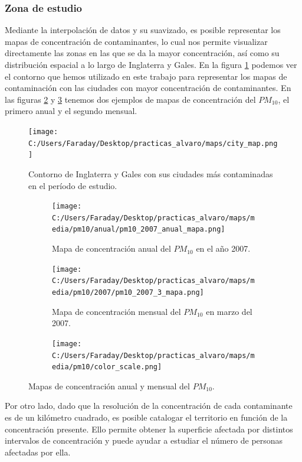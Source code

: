 \documentclass[12pt]{article}
\begin{document}
\subsubsection{Zona de estudio}

Mediante la interpolación de datos y su suavizado, es posible representar los mapas de concentración de contaminantes, lo cual nos permite visualizar directamente las zonas en las que se da la mayor concentración, así como su distribución espacial a lo largo de Inglaterra y Gales. En la figura \ref{fig:map-city} podemos ver el contorno que hemos utilizado en este trabajo para representar los mapas de contaminación con las ciudades con mayor concentración de contaminantes. En las figuras \ref{fig:map-ejem-1} y \ref{fig:map-ejem-2} tenemos dos ejemplos de mapas de concentración del $PM_{10}$, el primero anual y el segundo mensual.

\begin{figure}[H]
\centering
\texttt{[image: C:/Users/Faraday/Desktop/practicas\_alvaro/maps/city\_map.png]}
\caption{Contorno de Inglaterra y Gales con sus ciudades más contaminadas en el período de estudio.}
\label{fig:map-city}
\end{figure}

\begin{figure}[H]
\centering
\begin{subfigure}[H]{0.45\textwidth}
\texttt{[image: C:/Users/Faraday/Desktop/practicas\_alvaro/maps/media/pm10/anual/pm10\_2007\_anual\_mapa.png]}
\caption{Mapa de concentración anual del $PM_{10}$ en el año 2007.}
\label{fig:map-ejem-1}
\end{subfigure}
%
\begin{subfigure}[H]{0.45\textwidth}
\texttt{[image: C:/Users/Faraday/Desktop/practicas\_alvaro/maps/media/pm10/2007/pm10\_2007\_3\_mapa.png]}
\caption{Mapa de concentración mensual del $PM_{10}$ en marzo del 2007.}
\label{fig:map-ejem-2}
\end{subfigure}

\begin{subfigure}[H]{0.45\textwidth}
\texttt{[image: C:/Users/Faraday/Desktop/practicas\_alvaro/maps/media/pm10/color\_scale.png]}
\captionsetup{labelformat=empty}
\caption{}
\end{subfigure}
\caption{Mapas de concentración anual y mensual del $PM_{10}$.}
\end{figure}

Por otro lado, dado que la resolución de la concentración de cada contaminante es de un kilómetro cuadrado, es posible catalogar el territorio en función de la concentración presente. Ello permite obtener la superficie afectada por distintos intervalos de concentración y puede ayudar a estudiar el número de personas afectadas por ella.
\end{document}
